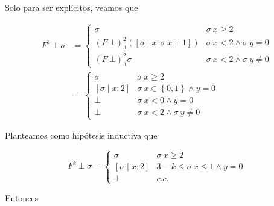 \documentclass[a4paper, 12pt]{article}
\begin{document}
Solo para ser explícitos, veamos que 

\begin{align*}
  F^3 ~ \bot  ~ \sigma 
  &= \begin{cases}
    \sigma & \sigma ~ x \geq 2 \\ 
    (F ~ \bot )^2_{\Bot} \left( [\sigma \mid x : \sigma ~ x + 1] \right)  & \sigma ~ x < 2
    \land \sigma ~ y = 0 \\
    (F ~ \bot )^2_{\Bot} \sigma  & \sigma ~ x < 2 \land \sigma ~ y \neq 0
  \end{cases} \\ 
  &= \begin{cases}
    \sigma & \sigma ~ x \geq 2 \\ 
    [\sigma \mid x : 2] & \sigma ~ x \in \left\{ 0, 1 \right\}  \land  y = 0 \\ 
    \bot  & \sigma ~ x < 0 \land  y = 0 \\ 
    \bot & \sigma ~ x <2 \land  \sigma ~  y \neq 0
  \end{cases}
\end{align*}

Planteamos como hipótesis inductiva que 

\begin{equation*}
  F^k ~ \bot ~ \sigma = \begin{cases}
    \sigma & \sigma ~ x \geq 2 \\ 
    [\sigma \mid x : 2] &3 - k \leq \sigma ~ x \leq 1 \land y = 0 \\ 
    \bot & c.c.
  \end{cases}
\end{equation*}

Entonces 
\end{document}
